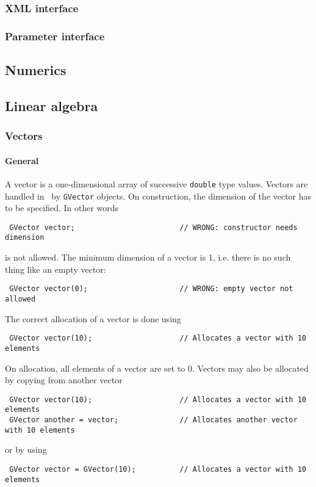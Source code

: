 \documentclass{article}[12pt,a4]
\begin{document}
\subsubsection{XML interface}

\subsubsection{Parameter interface}


\subsection{Numerics}


\subsection{Linear algebra}

\subsubsection{Vectors}

\paragraph{General}

A vector is a one-dimensional array of successive {\tt double} type values.
Vectors are handled in \this\ by {\tt GVector} objects.
On construction, the dimension of the vector has to be specified.
In other words
\begin{verbatim}
 GVector vector;                        // WRONG: constructor needs dimension
\end{verbatim}
is not allowed.
The minimum dimension of a vector is 1, i.e. there is no such thing 
like an empty vector:
\begin{verbatim}
 GVector vector(0);                     // WRONG: empty vector not allowed
\end{verbatim}
The correct allocation of a vector is done using
\begin{verbatim}
 GVector vector(10);                    // Allocates a vector with 10 elements
\end{verbatim}
On allocation, all elements of a vector are set to 0.
Vectors may also be allocated by copying from another vector
\begin{verbatim}
 GVector vector(10);                    // Allocates a vector with 10 elements
 GVector another = vector;              // Allocates another vector with 10 elements
\end{verbatim}
or by using 
\begin{verbatim}
 GVector vector = GVector(10);          // Allocates a vector with 10 elements
\end{verbatim}
\end{document}
